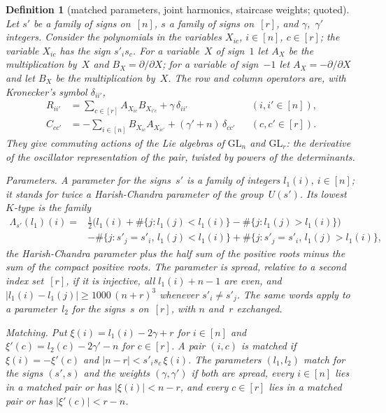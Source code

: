 \documentclass[11pt,a4paper]{article}
\newcommand{\m}[1]{\mbox{$#1$}}        %
\theoremstyle{plainx}
\theoremstyle{uprightx}
\newtheorem{definition}[theorem]{Definition}
\newcommand{\lkt}[2]{\Lambda_{#1}(#2)}
\begin{document}
\begin{definition}[matched parameters, joint harmonics, staircase weights; quoted]\label{d:jh}
Let $s'$ be a family of signs on~$[n]$, $s$ a family of signs on~$[r]$, and $\gamma$,~$\gamma'$ integers. Consider
the polynomials in the variables \m{X_{ic}}, \m{i\in[n]}, \m{c\in[r]}; the variable \m{X_{ic}} has the sign
\m{s'_{i}s_{c}}. For a variable~$X$ of sign~$1$ let $A_{X}$ be the multiplication by~$X$ and \m{B_{X}=\partial/\partial X};
for a variable of sign~$-1$ let \m{A_{X}=-\partial/\partial X} and let $B_{X}$ be the multiplication by~$X$. The
\emph{row} and \emph{column operators} are, with Kronecker's symbol \m{\delta_{ii'}},
\begin{align*}
R_{ii'}&=\sum_{c\in[r]}A_{X_{ic}}B_{X_{i'c}}+\gamma\,\delta_{ii'}&&(i,i'\in[n]),\\
C_{cc'}&=-\sum_{i\in[n]}B_{X_{ic}}A_{X_{ic'}}+(\gamma'+n)\,\delta_{cc'}&&(c,c'\in[r]).
\end{align*}
They give commuting actions of the Lie algebras of \m{\mathrm{GL}_{n}} and \m{\mathrm{GL}_{r}}: the derivative of the
oscillator representation of the pair, twisted by powers of the determinants.

\emph{Parameters.} A \emph{parameter} for the signs~$s'$ is a family of integers \m{l_{1}(i)}, \m{i\in[n]}; it stands
for twice a Harish-Chandra parameter of the group~$U(s')$. Its \emph{lowest $K$-type} is the family
\begin{align*}
\lkt{s'}{l_{1}}(i)={}&\tfrac12\bigl(l_{1}(i)+\#\{j:l_{1}(j)<l_{1}(i)\}-\#\{j:l_{1}(j)>l_{1}(i)\}\bigr)\\
&-\#\{j:s'_{j}=s'_{i},\,l_{1}(j)<l_{1}(i)\}+\#\{j:s'_{j}=s'_{i},\,l_{1}(j)>l_{1}(i)\},
\end{align*}
the Harish-Chandra parameter plus the half sum of the positive roots minus the sum of the compact positive
roots. The parameter is \emph{spread}, relative to a second index set~$[r]$, if it is injective, all
\m{l_{1}(i)+n-1} are even, and \m{|l_{1}(i)-l_{1}(j)|\ge1000\,(n+r)^{3}} whenever \m{s'_{i}\ne s'_{j}}. The same words
apply to a parameter~$l_{2}$ for the signs~$s$ on~$[r]$, with $n$ and~$r$ exchanged.

\emph{Matching.} Put \m{\xi(i)=l_{1}(i)-2\gamma+r} for \m{i\in[n]} and \m{\xi'(c)=l_{2}(c)-2\gamma'-n} for \m{c\in[r]}.
A pair \m{(i,c)} is \emph{matched} if \m{\xi(i)=-\xi'(c)} and \m{|n-r|<s'_{i}s_{c}\,\xi(i)}. The parameters
\m{(l_{1},l_{2})} \emph{match} for the signs \m{(s',s)} and the weights \m{(\gamma,\gamma')} if both are spread, every
\m{i\in[n]} lies in a matched pair or has \m{|\xi(i)|<n-r}, and every \m{c\in[r]} lies in a matched pair or has
\m{|\xi'(c)|<r-n}.


\end{definition}
\end{document}
